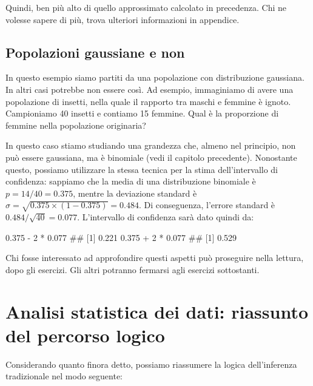 \documentclass[a4paper,12pt,oneside]{book}
\newenvironment{Shaded}{\begin{snugshade}}{\end{snugshade}}
\newcommand{\DecValTok}[1]{#1}
\newcommand{\FloatTok}[1]{#1}
\newcommand{\SpecialCharTok}[1]{#1}
\newcommand{\DocumentationTok}[1]{#1}
\begin{document}
Quindi, ben più alto di quello approssimato calcolato in precedenza. Chi ne volesse sapere di più, trova ulteriori informazioni in appendice.

\hypertarget{popolazioni-gaussiane-e-non}{%
\subsection{Popolazioni gaussiane e non}\label{popolazioni-gaussiane-e-non}}

In questo esempio siamo partiti da una popolazione con distribuzione gaussiana. In altri casi potrebbe non essere così. Ad esempio, immaginiamo di avere una popolazione di insetti, nella quale il rapporto tra maschi e femmine è ignoto. Campioniamo 40 insetti e contiamo 15 femmine. Qual è la proporzione di femmine nella popolazione originaria?

In questo caso stiamo studiando una grandezza che, almeno nel principio, non può essere gaussiana, ma è binomiale (vedi il capitolo precedente). Nonostante questo, possiamo utilizzare la stessa tecnica per la stima dell'intervallo di confidenza: sappiamo che la media di una distribuzione binomiale è \(p = 14/40 = 0.375\), mentre la deviazione standard è \(\sigma = \sqrt{0.375 \times (1 - 0.375)} = 0.484\). Di conseguenza, l'errore standard è \(0.484 / \sqrt{40} = 0.077\). L'intervallo di confidenza sarà dato quindi da:

\begin{Shaded}
\begin{Highlighting}[]
\FloatTok{0.375} \SpecialCharTok{{-}} \DecValTok{2} \SpecialCharTok{*} \FloatTok{0.077}
\DocumentationTok{\#\# [1] 0.221}
\FloatTok{0.375} \SpecialCharTok{+} \DecValTok{2} \SpecialCharTok{*} \FloatTok{0.077}
\DocumentationTok{\#\# [1] 0.529}
\end{Highlighting}
\end{Shaded}

Chi fosse interessato ad approfondire questi aspetti può proseguire nella lettura, dopo gli esercizi. Gli altri potranno fermarsi agli esercizi sottostanti.

\hypertarget{analisi-statistica-dei-dati-riassunto-del-percorso-logico}{%
\section{Analisi statistica dei dati: riassunto del percorso logico}\label{analisi-statistica-dei-dati-riassunto-del-percorso-logico}}

Considerando quanto finora detto, possiamo riassumere la logica dell'inferenza tradizionale nel modo seguente:
\end{document}
